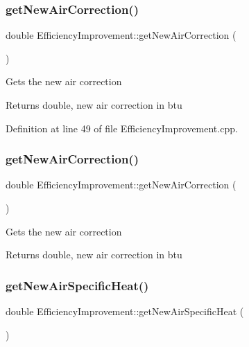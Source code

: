 \subsubsection{\texorpdfstring{get\+New\+Air\+Correction()}{getNewAirCorrection()}\hspace{0.1cm}{\footnotesize\ttfamily [2/3]}}
{\footnotesize\ttfamily double Efficiency\+Improvement\+::get\+New\+Air\+Correction (\begin{DoxyParamCaption}{ }\end{DoxyParamCaption})}

Gets the new air correction

\begin{DoxyReturn}{Returns}
double, new air correction in btu 
\end{DoxyReturn}


Definition at line 49 of file Efficiency\+Improvement.\+cpp.

\mbox{\label{class_efficiency_improvement_a0339daa6d9cfc25e8da4f9efef73b3d8}} 
\subsubsection{\texorpdfstring{get\+New\+Air\+Correction()}{getNewAirCorrection()}\hspace{0.1cm}{\footnotesize\ttfamily [3/3]}}
{\footnotesize\ttfamily double Efficiency\+Improvement\+::get\+New\+Air\+Correction (\begin{DoxyParamCaption}{ }\end{DoxyParamCaption})}

Gets the new air correction

\begin{DoxyReturn}{Returns}
double, new air correction in btu 
\end{DoxyReturn}
\mbox{\label{class_efficiency_improvement_a71ab10ba190cb99edb85fcd7f679e721}} 
\subsubsection{\texorpdfstring{get\+New\+Air\+Specific\+Heat()}{getNewAirSpecificHeat()}\hspace{0.1cm}{\footnotesize\ttfamily [1/3]}}
{\footnotesize\ttfamily double Efficiency\+Improvement\+::get\+New\+Air\+Specific\+Heat (\begin{DoxyParamCaption}{ }\end{DoxyParamCaption})}

